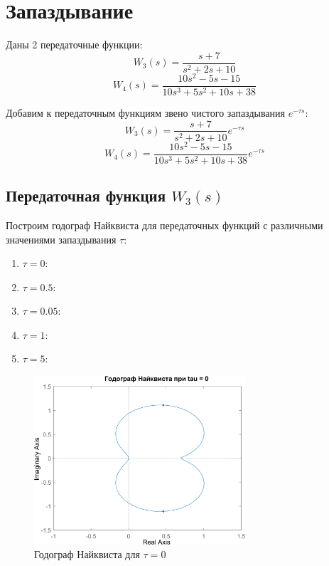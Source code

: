 \chapter{Запаздывание}
Даны 2 передаточные функции:
\[
W_3(s) = \frac{s + 7}{s^2 + 2s + 10}
\]
\[
W_4(s) = \frac{10s^2 - 5s - 15}{10s^3 + 5s^2 + 10s + 38}
\]

Добавим к передаточным функциям звено чистого запаздывания $e^{-\tau s}$:
\[
W_3(s) = \frac{s + 7}{s^2 + 2s + 10}e^{-\tau s}
\]
\[
W_4(s) = \frac{10s^2 - 5s - 15}{10s^3 + 5s^2 + 10s + 38}e^{-\tau s}
\]

\section{Передаточная функция $W_3(s)$}

Построим годограф Найквиста для передаточных функций с различными значениями запаздывания $\tau$:
\begin{enumerate}
    \item $\tau = 0$:
    \item $\tau = 0.5$:
    \item $\tau = 0.05$:
    \item $\tau = 1$:
    \item $\tau = 5$:
\end{enumerate}

\begin{figure}[H]
    \centering
    \centering
    \includegraphics[width=0.7\textwidth, trim={0cm 0cm 0cm 0cm}]{../images/3_1_0_hod.png}
    \caption{Годограф Найквиста для $\tau = 0$}
\end{figure}

